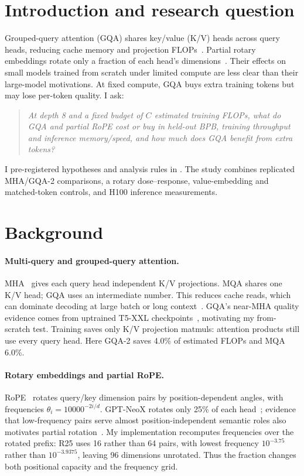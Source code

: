 \documentclass[10pt,twocolumn]{article}
\begin{document}
\section{Introduction and research question}
Grouped-query attention (GQA) shares key/value (K/V) heads across query heads, reducing cache memory and
projection FLOPs~\cite{ainslie2023gqa,shazeer2019mqa}. Partial rotary embeddings rotate only a fraction of each
head's dimensions~\cite{su2021roformer,black2022gptneox}. Their effects on small models trained from scratch under
limited compute are less clear than their large-model motivations. At fixed compute, GQA buys extra training tokens
but may lose per-token quality. I ask:
\begin{quote}\itshape
At depth 8 and a fixed budget of $C$ estimated training FLOPs, what do GQA and partial RoPE cost or buy in
held-out BPB, training throughput and inference memory/speed, and how much does GQA benefit from extra tokens?
\end{quote}
I pre-registered hypotheses and analysis rules in . The study combines replicated
MHA/GQA-2 comparisons, a rotary dose--response, value-embedding and matched-token controls, and H100 inference measurements.

\section{Background}
\paragraph{Multi-query and grouped-query attention.}
MHA~\cite{vaswani2017attention} gives each query head independent K/V projections. MQA shares one K/V head;
GQA uses an intermediate number. This reduces cache reads, which can dominate decoding at large batch or long
context~\cite{shazeer2019mqa,pope2023efficiently}. GQA's near-MHA quality evidence comes from uptrained T5-XXL
checkpoints~\cite{ainslie2023gqa}, motivating my from-scratch test. Training saves only K/V projection matmuls:
attention products still use every query head. Here GQA-2 saves 4.0\% of estimated FLOPs and MQA 6.0\%.

\paragraph{Rotary embeddings and partial RoPE.}
RoPE~\cite{su2021roformer} rotates query/key dimension pairs by position-dependent angles, with frequencies
$\theta_i=10000^{-2i/d}$. GPT-NeoX rotates only 25\% of each head~\cite{black2022gptneox}; evidence that low-frequency
pairs serve almost position-independent semantic roles also motivates partial rotation~\cite{barbero2025round}.
My implementation recomputes frequencies over the rotated prefix: R25 uses 16 rather than 64 pairs, with lowest
frequency $10^{-3.75}$ rather than $10^{-3.9375}$, leaving 96 dimensions unrotated. Thus the fraction changes both
positional capacity and the frequency grid.
\end{document}
